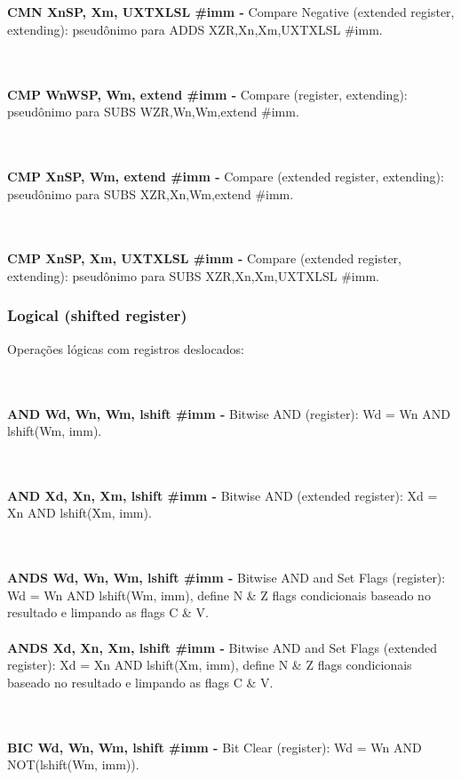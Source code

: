 \documentclass[12pt,a4paper,utf8]{ppgsi}
\begin{document}
\\\\\textbf{CMN Xn\textbar SP, Xm{, UXTX\textbar LSL \#imm} -} Compare Negative (extended register, extending): pseudônimo para ADDS XZR,Xn,Xm{,UXTX\textbar LSL \#imm}. 

\\\\\textbf{CMP Wn\textbar WSP, Wm, extend {#imm} -} Compare (register, extending): pseudônimo para SUBS WZR,Wn,Wm,extend {#imm}. 

\\\\\textbf{CMP Xn\textbar SP, Wm, extend {#imm} -} Compare (extended register, extending): pseudônimo para SUBS XZR,Xn,Wm,extend {#imm}. 

\\\\\textbf{CMP Xn\textbar SP, Xm{, UXTX\textbar LSL \#imm} -} Compare (extended register, extending): pseudônimo para SUBS XZR,Xn,Xm{,UXTX\textbar LSL \#imm}. 



\subsubsection{Logical (shifted register)}
Operações lógicas com registros deslocados:

\\\\\textbf{AND Wd, Wn, Wm{, lshift \#imm} -} Bitwise AND (register): Wd = Wn AND lshift(Wm, imm). 

\\\\\textbf{AND Xd, Xn, Xm{, lshift \#imm} -} Bitwise AND (extended register): Xd = Xn AND lshift(Xm, imm). 

\\\\\textbf{ANDS Wd, Wn, Wm{, lshift \#imm} -} Bitwise AND and Set Flags (register): Wd = Wn AND lshift(Wm, imm), define N \& Z flags condicionais
baseado no resultado e limpando as flags C \& V. 
\\\\\textbf{ANDS Xd, Xn, Xm{, lshift \#imm} -} Bitwise AND and Set Flags (extended register): Xd = Xn AND lshift(Xm, imm), define N \& Z flags condicionais
baseado no resultado e limpando as flags C \& V. 

\\\\\textbf{BIC Wd, Wn, Wm{, lshift \#imm} -} Bit Clear (register): Wd = Wn AND NOT(lshift(Wm, imm)). 
\end{document}
